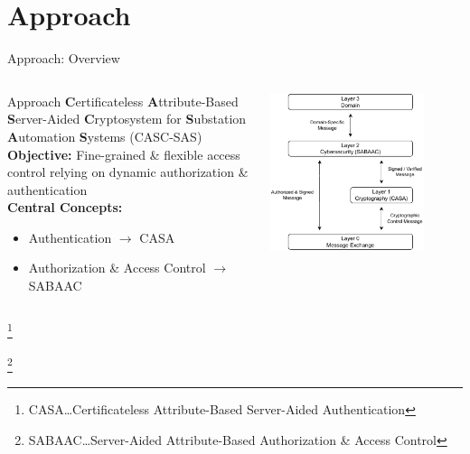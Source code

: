 \documentclass[en]{sdqbeamer}
\newcommand\nonumberfootnote[1]{%
  \begingroup
  \renewcommand\thefootnote{}\footnote{#1}%
  \addtocounter{footnote}{-1}%
  \endgroup
}
\begin{document}
\section{Approach}
\begin{frame}{Approach: Overview}
    \begin{columns}[T, onlytextwidth]
        \begin{greenblock}{Approach}
            \textbf{C}ertificateless \textbf{A}ttribute-Based \textbf{S}erver-Aided \textbf{C}ryptosystem for \textbf{S}ubstation \textbf{A}utomation \textbf{S}ystems (CASC-SAS)\\
            \vspace{1em}
            \textbf{Objective:} Fine-grained \& flexible access control relying on dynamic authorization \& authentication
            \vspace{1em}
            \\\textbf{Central Concepts:}
            \begin{itemize}
                \item Authentication $\rightarrow$ CASA
                \item Authorization \& Access Control $\rightarrow$ SABAAC
            \end{itemize}
        \end{greenblock}
        \centering
        \includegraphics[width=0.80\textwidth]{./figures/layers_request_example_shortened.drawio.pdf}
    \end{columns}
    \nonumberfootnote{CASA\dots Certificateless Attribute-Based Server-Aided Authentication}
    \nonumberfootnote{SABAAC\dots Server-Aided Attribute-Based Authorization \& Access Control}
\end{frame}
\end{document}
